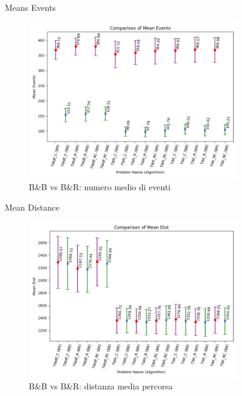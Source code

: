 \documentclass[10pt]{beamer}
\begin{document}
    \begin{frame}{Means Events}
        \begin{figure}[!h]
            \centering
            \includegraphics[width=0.82\textwidth]{Images/mean_events}
            \caption{B\&B vs B\&R: numero medio di eventi}
            \label{fig:mean_events}
        \end{figure}
    \end{frame}

    \begin{frame}{Mean Distance}
        \begin{figure}[h!]
            \centering
            \includegraphics[width=0.82\textwidth]{Images/mean_dist.png}
            \caption{B\&B vs B\&R: distanza media percorsa}
            \label{fig:Mean_dist}
        \end{figure}
    \end{frame}
\end{document}
